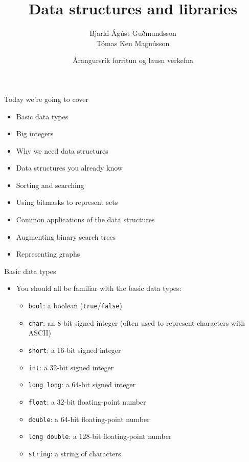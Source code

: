 \documentclass[12pt,t]{beamer}
\title{Data structures and libraries}
\author{Bjarki Ágúst Guðmundsson \\ Tómas Ken Magnússon}
\institute{\href{http://ru.is/td}{School of Computer Science} \\[2pt] \href{http://ru.is}{Reykjavík University}}
\date{Árangursrík forritun og lausn verkefna}
\newcommand{\bi}{\begin{itemize}}
\newcommand{\ei}{\end{itemize}}
\begin{document}
{
    \frame{
        \titlepage
    }
}


\begin{frame}{Today we're going to cover}
    \vspace{30pt}
    \bi
        \item Basic data types
        \item Big integers
        \item Why we need data structures
        \item Data structures you already know
        \item Sorting and searching
        \item Using bitmasks to represent sets
        \item Common applications of the data structures
        \item Augmenting binary search trees
        \item Representing graphs
    \ei
\end{frame}


\begin{frame}{Basic data types}
    \bi
        \vspace{20pt}

        \item You should all be familiar with the basic data types:

        \bi
            \item \texttt{bool}: a boolean (\texttt{true}/\texttt{false})
            \vspace{5pt}
            \item \texttt{char}: an 8-bit signed integer (often used to represent characters with ASCII)
            \item \texttt{short}: a 16-bit signed integer
            \item \texttt{int}: a 32-bit signed integer
            \item \texttt{long long}: a 64-bit signed integer
            \vspace{5pt}
            \item \texttt{float}: a 32-bit floating-point number
            \item \texttt{double}: a 64-bit floating-point number
            \item \texttt{long double}: a 128-bit floating-point number
            \vspace{10pt}
            \item \texttt{string}: a string of characters
        \ei
    \ei
\end{frame}
\end{document}
